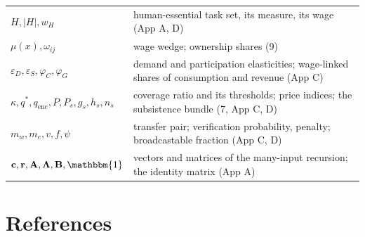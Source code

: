 \documentclass[12pt]{article}
\theoremstyle{plain}
\begin{document}
\begin{center}
{\begin{tabular}{l p{9.6cm}}
$H, |H|, w_H$ & human-essential task set, its measure, its wage (App A, D) \\
$\mu (x), \omega _{ij}$ & wage wedge; ownership shares (9) \\
$\varepsilon _D, \varepsilon _S, \varphi _C, \varphi _G$ & demand and participation elasticities; wage-linked shares of consumption and revenue (App C) \\
$\kappa , q^*, q_{\mathrm{enc}}, P, P_s, g_s, h_s, n_s$ & coverage ratio and its thresholds; price indices; the subsistence bundle (7, App C, D) \\
$m_w, m_e, v, f, \psi$ & transfer pair; verification probability, penalty; broadcastable fraction (App C, D) \\
$\mathbf{c}, \mathbf{r}, \mathbf{A}, \boldsymbol{\Lambda}, \mathbf{B}, \mathbbm{1}$ & vectors and matrices of the many-input recursion; the identity matrix (App A) \\
\bottomrule
\end{tabular}
}
\end{center}

\section*{References}
\end{document}

